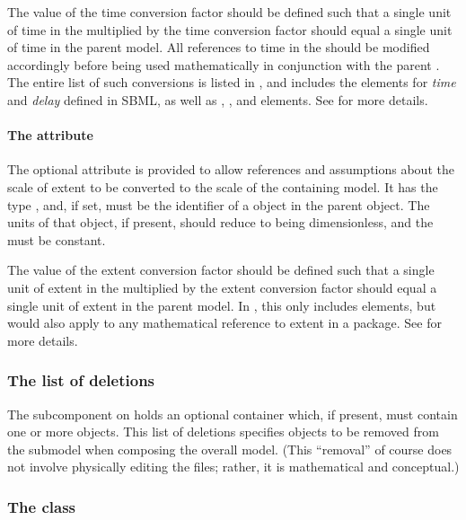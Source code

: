 The value of the time conversion factor should be defined such that a
single unit of time in the \Submodel  multiplied by the time
conversion factor should equal a single unit of time in the parent model.
All references to time in the \Submodel should be modified accordingly
before being used mathematically in conjunction with the parent \Model.
The entire list of such \sbmlthreecore conversions is listed in
, and includes the  elements for
\emph{time} and \emph{delay} defined in SBML, as well as \Delay,
\RateRule, and \KineticLaw elements.  See  for
more details.


\paragraph{The \fixttspace{} attribute}
\label{submodel-extentconversionfactor}

The optional  attribute is provided to allow
references and assumptions about the scale of extent to be converted to 
the scale of the containing model.  It has the type ,
and, if set, must be the identifier of a \Parameter object in the 
parent \Model object.  The units of that \Parameter object, if present,
should reduce to being dimensionless, and the \Parameter must be constant.

The value of the extent conversion factor should be defined such that a
single unit of extent in the \Submodel multiplied by the extent conversion
factor should equal a single unit of extent in the parent model. 
In \sbmlthreecore, this only
includes \KineticLaw elements, but would also apply to any mathematical 
reference to extent in a package. See  for more details.


\subsubsection{The list of deletions}
\label{listofdeletions}

The  subcomponent on \Submodel holds an optional
\ListOfDeletions container which, if present, must contain one or more
\Deletion objects.  This list of deletions specifies objects to be
removed from the submodel when composing the overall model.  (This
``removal'' of course does not involve physically editing the files;
rather, it is mathematical and conceptual.)


\subsubsection{The  class}
\label{deletion-class}

